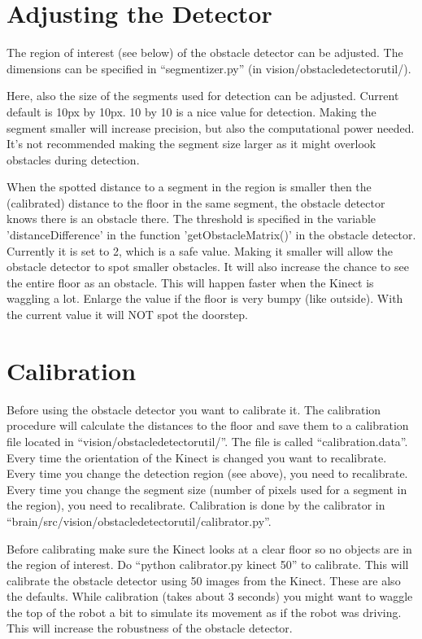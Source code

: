\documentclass[a4paper, 12pt, oneside]{report}
\begin{document}
\section{Adjusting the Detector}

The region of interest (see below) of the obstacle detector can be adjusted. 
The dimensions can be specified in ``segmentizer.py'' (in vision/obstacledetectorutil/).

Here, also the size of the segments used for detection can be adjusted. 
Current default is 10px by 10px. 10 by 10 is a nice value for detection. 
Making the segment smaller will increase precision, but also the computational power needed. 
It's not recommended making the segment size larger as it might overlook obstacles during detection.

When the spotted distance to a segment in the region is smaller then the (calibrated) distance to the floor in the same segment, the obstacle detector knows there is an obstacle there. 
The threshold is specified in the variable 'distanceDifference' in the function 'getObstacleMatrix()' in the obstacle detector. 
Currently it is set to 2, which is a safe value. 
Making it smaller will allow the obstacle detector to spot smaller obstacles. 
It will also increase the chance to see the entire floor as an obstacle. 
This will happen faster when the Kinect is waggling a lot. 
Enlarge the value if the floor is very bumpy (like outside). 
With the current value it will NOT spot the doorstep.

\section{Calibration}

Before using the obstacle detector you want to calibrate it. 
The calibration procedure will calculate the distances to the floor and save them to a calibration file located in ``vision/obstacledetectorutil/''. 
The file is called ``calibration.data''. 
Every time the orientation of the Kinect is changed you want to recalibrate. 
Every time you change the detection region (see above), you need to recalibrate. 
Every time you change the segment size (number of pixels used for a segment in the region), you need to recalibrate. 
Calibration is done by the calibrator in ``brain/src/vision/obstacledetectorutil/calibrator.py''. 

Before calibrating make sure the Kinect looks at a clear floor so no objects are in the region of interest.
Do ``python calibrator.py kinect 50'' to calibrate.
This will calibrate the obstacle detector using 50 images from the Kinect. 
These are also the defaults. 
While calibration (takes about 3 seconds) you might want to waggle the top of the robot a bit to simulate its movement as if the robot was driving. 
This will increase the robustness of the obstacle detector.
\end{document}
